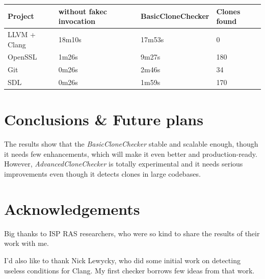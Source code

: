 \documentclass[a0,portrait]{a0poster}
\begin{document}
\begin{multicols}{2}
\begin{center}\vspace{1cm}
\begin{tabular}{l l l l}
\toprule
\textbf{Project} & \textbf{without fakec invocation} & 
\textbf{BasicCloneChecker} & \textbf{Clones found} \\
\midrule
LLVM + Clang & 18m10s & 17m53s & 0 \\
OpenSSL & 1m26s & 9m27s & 180 \\
Git & 0m26s & 2m46s & 34 \\
SDL & 0m26s & 1m59s & 170 \\
\bottomrule
\end{tabular}
\end{center}\vspace{1cm}


\section*{Conclusions \& Future plans}

The results show that the \textit{BasicCloneChecker} stable and scalable enough, though
it needs few enhancements, which will make it even better and production-ready. However,
\textit{AdvancedCloneChecker} is totally experimental and it needs serious improvements
even though it detects clones in large codebases.


\nocite{*}



\section*{Acknowledgements}

Big thanks to ISP RAS researchers, who were so kind to share the results of their work
with me.

I'd also like to thank Nick Lewycky, who did some initial work on detecting useless
conditions for Clang. My first checker borrows few ideas from that work.


\end{multicols}
\end{document}
